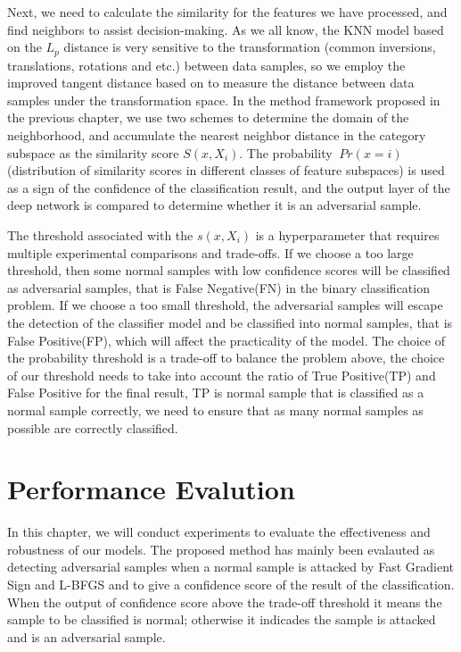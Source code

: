 \documentclass{ieeeaccess}
\begin{document}
Next, we need to calculate the similarity for the features we have processed, and find neighbors to assist decision-making. As we all know, the KNN model based on the $L_p$ distance is very sensitive to the transformation (common inversions, translations, rotations and etc.) between data samples, so we employ the improved tangent distance based on \cite{simard1998transformation} to measure the distance between data samples under the transformation space. 
In the method framework proposed in the previous chapter, we use two schemes to determine the domain of the neighborhood, and accumulate the nearest neighbor distance in the category subspace as the similarity score $S(x,X_i)$. The probability $ \ Pr (x = i) $ (distribution of similarity scores in different classes of feature subspaces) is used as a sign of the confidence of the classification result, and the output layer of the deep network is compared to determine whether it is an adversarial sample.

The threshold associated with the $s(x, X_{i})$ is a hyperparameter that requires multiple experimental comparisons and trade-offs. If we choose a too large threshold, then some normal samples with low confidence scores will be classified as adversarial samples, that is False Negative(FN) in the binary classification problem. If we choose a too small threshold, the adversarial samples will escape the detection of the classifier model and be classified into normal samples, that is False Positive(FP), which will affect the practicality of the model.
The choice of the probability threshold is a trade-off to balance the problem above, the choice of our threshold needs to take into account the ratio of True Positive(TP) and False Positive for the final result, TP is normal sample that is classified as a normal sample correctly, we need to ensure that as many normal samples as possible are correctly classified.


\section{Performance Evalution}	
In this chapter, we will conduct experiments to evaluate the effectiveness and robustness of our models. The proposed method has mainly been evalauted as detecting adversarial samples when a normal sample is attacked by Fast Gradient Sign and L-BFGS and to give a confidence score of the result of the classification. When the output of confidence score above the trade-off threshold it means the sample to be classified is normal; otherwise it  indicades the sample is attacked and is an adversarial sample.
\end{document}

